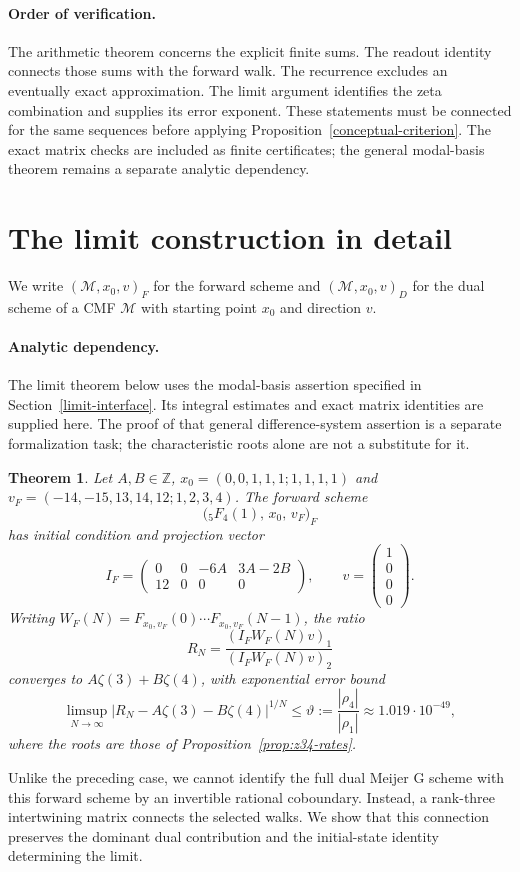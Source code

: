\documentclass[11pt]{article}
\newtheorem{theorem}{Theorem}
\begin{document}
\paragraph{Order of verification.}
The arithmetic theorem concerns the explicit finite sums. The readout
identity connects those sums with the forward walk. The recurrence
excludes an eventually exact approximation. The limit argument identifies
the zeta combination and supplies its error exponent. These statements
must be connected for the same sequences before applying
Proposition~\ref{conceptual-criterion}. The exact matrix checks are
included as finite certificates; the general modal-basis theorem remains
a separate analytic dependency.

\clearpage\appendix
\section{The limit construction in detail}\label{limit-details}

We write $(\mathcal M,x_0,v)_F$ for the forward scheme and
$(\mathcal M,x_0,v)_D$ for the dual scheme of a CMF $\mathcal M$ with
starting point $x_0$ and direction $v$.

\paragraph{Analytic dependency.}
The limit theorem below uses the modal-basis assertion specified in
Section~\ref{limit-interface}. Its integral estimates and exact matrix
identities are supplied here. The proof of that general difference-system
assertion is a separate formalization task; the characteristic roots
alone are not a substitute for it.

\begin{theorem}
\label{thm:z34-limit}
Let $A,B\in\mathbb Z$, $x_0=(0,0,1,1,1;1,1,1,1)$ and
$v_F=(-14,-15,13,14,12;1,2,3,4)$.
The forward scheme
\[
\bigl({}_5F_4(1),\,x_0,\,v_F\bigr)_F
\]
has initial condition and projection vector
\[
I_F=\begin{pmatrix}0&0&-6A&3A-2B\\12&0&0&0\end{pmatrix},
\qquad v=\begin{pmatrix}1\\0\\0\\0\end{pmatrix}.
\]
Writing $W_F(N)=F_{x_0,v_F}(0)\cdots F_{x_0,v_F}(N-1)$, the ratio
\[
R_N=\frac{(I_FW_F(N)v)_1}{(I_FW_F(N)v)_2}
\]
converges to $A\zeta(3)+B\zeta(4)$, with exponential error bound
\[
\limsup_{N\to\infty}|R_N-A\zeta(3)-B\zeta(4)|^{1/N}
\leq\vartheta:=\frac{|\rho_4|}{|\rho_1|}
\approx1.019\cdot10^{-49},
\]
where the roots are those of Proposition~\ref{prop:z34-rates}.
\end{theorem}
Unlike the preceding case, we cannot identify the full dual Meijer G
scheme with this forward scheme by an invertible rational coboundary.
Instead, a rank-three intertwining matrix connects the selected walks.
We show that this connection preserves the dominant dual contribution
and the initial-state identity determining the limit.
\end{document}
